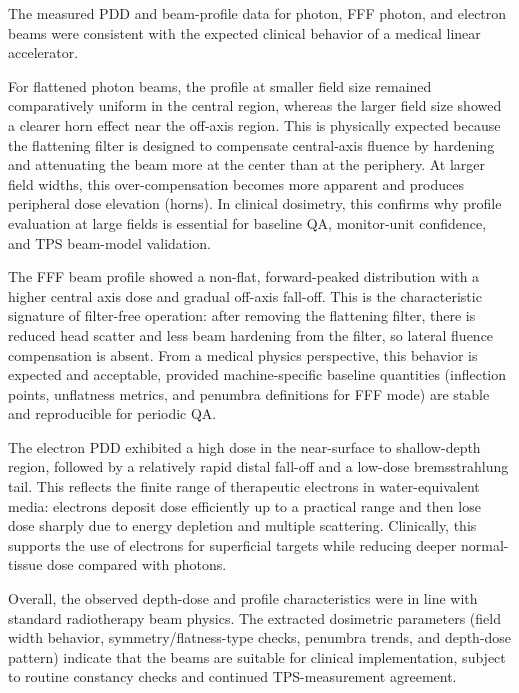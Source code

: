 The measured PDD and beam-profile data for photon, FFF photon, and electron beams were consistent with the expected clinical behavior of a medical linear accelerator.

For flattened photon beams, the profile at smaller field size remained comparatively uniform in the central region, whereas the larger field size showed a clearer horn effect near the off-axis region. This is physically expected because the flattening filter is designed to compensate central-axis fluence by hardening and attenuating the beam more at the center than at the periphery. At larger field widths, this over-compensation becomes more apparent and produces peripheral dose elevation (horns). In clinical dosimetry, this confirms why profile evaluation at large fields is essential for baseline QA, monitor-unit confidence, and TPS beam-model validation.

The FFF beam profile showed a non-flat, forward-peaked distribution with a higher central axis dose and gradual off-axis fall-off. This is the characteristic signature of filter-free operation: after removing the flattening filter, there is reduced head scatter and less beam hardening from the filter, so lateral fluence compensation is absent. From a medical physics perspective, this behavior is expected and acceptable, provided machine-specific baseline quantities (inflection points, unflatness metrics, and penumbra definitions for FFF mode) are stable and reproducible for periodic QA.

The electron PDD exhibited a high dose in the near-surface to shallow-depth region, followed by a relatively rapid distal fall-off and a low-dose bremsstrahlung tail. This reflects the finite range of therapeutic electrons in water-equivalent media: electrons deposit dose efficiently up to a practical range and then lose dose sharply due to energy depletion and multiple scattering. Clinically, this supports the use of electrons for superficial targets while reducing deeper normal-tissue dose compared with photons.

Overall, the observed depth-dose and profile characteristics were in line with standard radiotherapy beam physics. The extracted dosimetric parameters (field width behavior, symmetry/flatness-type checks, penumbra trends, and depth-dose pattern) indicate that the beams are suitable for clinical implementation, subject to routine constancy checks and continued TPS-measurement agreement.
